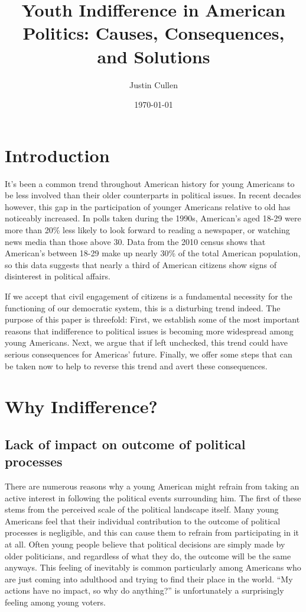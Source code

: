 \documentclass[12pt,letterpaper]{article}
\begin{document}
\title{Youth Indifference in American Politics: Causes, Consequences,
and Solutions}
\author{Justin Cullen}
\date{\today}
\maketitle

\section{Introduction} %
\label{sec:Introduction}
It's been a common trend throughout American history for young
Americans to be less involved than their older counterparts in
political issues.  In recent decades however, this gap in the
participation of younger Americans relative to old has noticeably
increased. In polls taken during the 1990s, American's aged 18-29 were
more than 20\% less likely to look forward to reading a newspaper, or
watching news media than those above 30. Data from the 2010 census
shows that American's between 18-29 make up nearly 30\% of the total
American population, so this data suggests that nearly a third of
American citizens show signs of disinterest in political affairs.  

If we accept that civil engagement of citizens is a fundamental
necessity for the functioning of our democratic system, this is a
disturbing trend indeed.  The purpose of this paper is threefold:
First, we establish some of the most important reasons that
indifference to political issues is becoming more widespread among
young Americans.  Next, we argue that if left unchecked, this trend
could have serious consequences for Americas' future.  Finally, we
offer some steps that can be taken now to help to reverse this trend
and avert these consequences.

\section{Why Indifference?} %
\label{sec:Why Indifference?}

\subsection{Lack of impact on outcome of political processes} There
are numerous reasons why a young American might refrain from taking an
active interest in following the political events surrounding him.
The first of these stems from the perceived scale of the political
landscape itself.  Many young Americans feel that their individual
contribution to the outcome of political processes is negligible, and
this can cause them to refrain from participating in it at all.  Often
young people believe that political decisions are simply made by older
politicians, and regardless of what they do, the outcome will be the
same anyways.  This feeling of inevitably is common particularly among
Americans who are just coming into adulthood and trying to find their
place in the world. ``My actions have no impact, so why do anything?''
is unfortunately a surprisingly feeling among young voters.
\end{document}
